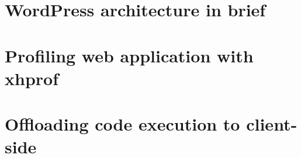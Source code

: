 \section{WordPress architecture in brief}

\section{Profiling web application with xhprof}

\section{Offloading code execution to client-side}


